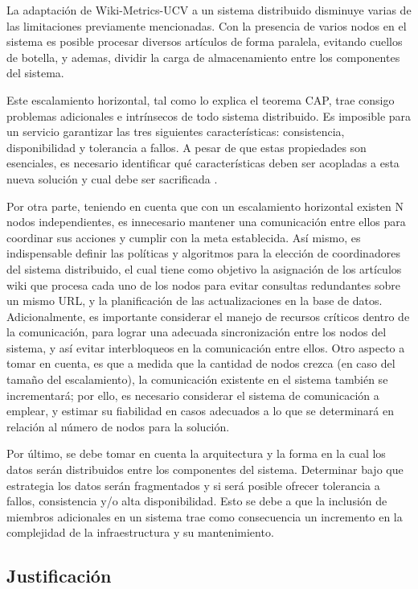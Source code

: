 La adaptación de Wiki-Metrics-UCV a un sistema distribuido disminuye varias de las limitaciones previamente
mencionadas. Con la presencia de varios nodos en el sistema es posible procesar diversos
artículos de forma paralela, evitando cuellos de botella, y ademas, dividir la carga de almacenamiento
entre los componentes del sistema.

Este escalamiento horizontal, tal como lo explica el teorema CAP, trae consigo problemas
adicionales e  intrínsecos de todo sistema distribuido. Es imposible para un servicio garantizar las tres
siguientes características: consistencia, disponibilidad y tolerancia a fallos. A pesar de que estas
propiedades son esenciales, es necesario identificar qué características deben ser acopladas a
esta nueva solución y cual debe ser sacrificada \cite{6}.

Por otra parte, teniendo en cuenta que con un escalamiento horizontal existen N
nodos independientes, es innecesario mantener una comunicación entre ellos para
coordinar sus acciones y cumplir con la meta establecida. Así mismo, es indispensable
definir las políticas y algoritmos para la elección de coordinadores del sistema
distribuido, el cual tiene como objetivo la asignación de los artículos wiki que procesa
cada uno de los nodos para evitar consultas redundantes sobre un mismo URL, y la
planificación de las actualizaciones en la base de datos. Adicionalmente, es importante
considerar el manejo de recursos críticos dentro de la comunicación, para lograr una
adecuada sincronización entre los nodos del sistema, y así evitar interbloqueos en la
comunicación entre ellos. Otro aspecto a tomar en cuenta, es que a medida que la
cantidad de nodos crezca (en caso del tamaño del escalamiento), la comunicación
existente en el sistema también se incrementará; por ello, es necesario considerar el
sistema de comunicación a emplear, y estimar su fiabilidad en casos adecuados a lo que
se determinará en relación al número de nodos para la solución.

Por último, se debe tomar en cuenta la arquitectura y la forma en la cual los datos
serán distribuidos entre los componentes del sistema. Determinar bajo que estrategia
los datos serán fragmentados y si será posible ofrecer tolerancia a fallos, consistencia y/o alta
disponibilidad. Esto se debe a que la inclusión de miembros adicionales en un sistema trae
como consecuencia un incremento en la complejidad de la infraestructura y su mantenimiento.

\subsection{Justificación}

